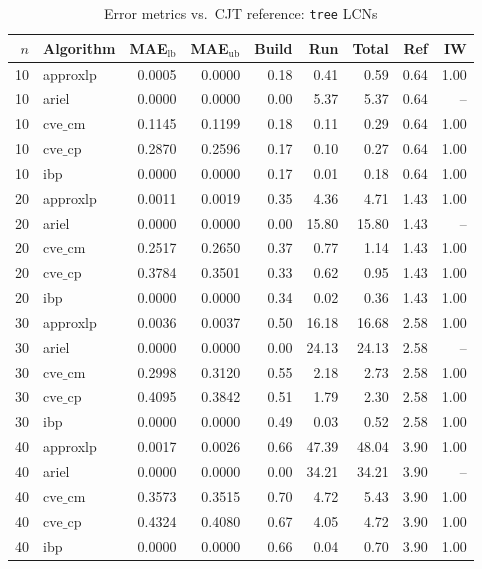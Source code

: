 \documentclass{article}
\begin{document}
\begin{table}[ht]
\centering
\caption{Error metrics vs.\ CJT reference: \texttt{tree} LCNs}
\begin{tabular}{rlrrrrrrr}
\toprule
 $n$ & Algorithm & MAE$_{\text{lb}}$ & MAE$_{\text{ub}}$ & Build & Run & Total & Ref & IW \\
\midrule
 10 & approxlp & 0.0005 & 0.0000 & 0.18 & 0.41 & 0.59 & 0.64 & 1.00 \\
 10 & ariel & 0.0000 & 0.0000 & 0.00 & 5.37 & 5.37 & 0.64 & -- \\
 10 & $\text{cve\_cm}$ & 0.1145 & 0.1199 & 0.18 & 0.11 & 0.29 & 0.64 & 1.00 \\
 10 & $\text{cve\_cp}$ & 0.2870 & 0.2596 & 0.17 & 0.10 & 0.27 & 0.64 & 1.00 \\
 10 & ibp & 0.0000 & 0.0000 & 0.17 & 0.01 & 0.18 & 0.64 & 1.00 \\
\hline
 20 & approxlp & 0.0011 & 0.0019 & 0.35 & 4.36 & 4.71 & 1.43 & 1.00 \\
 20 & ariel & 0.0000 & 0.0000 & 0.00 & 15.80 & 15.80 & 1.43 & -- \\
 20 & $\text{cve\_cm}$ & 0.2517 & 0.2650 & 0.37 & 0.77 & 1.14 & 1.43 & 1.00 \\
 20 & $\text{cve\_cp}$ & 0.3784 & 0.3501 & 0.33 & 0.62 & 0.95 & 1.43 & 1.00 \\
 20 & ibp & 0.0000 & 0.0000 & 0.34 & 0.02 & 0.36 & 1.43 & 1.00 \\
\hline
 30 & approxlp & 0.0036 & 0.0037 & 0.50 & 16.18 & 16.68 & 2.58 & 1.00 \\
 30 & ariel & 0.0000 & 0.0000 & 0.00 & 24.13 & 24.13 & 2.58 & -- \\
 30 & $\text{cve\_cm}$ & 0.2998 & 0.3120 & 0.55 & 2.18 & 2.73 & 2.58 & 1.00 \\
 30 & $\text{cve\_cp}$ & 0.4095 & 0.3842 & 0.51 & 1.79 & 2.30 & 2.58 & 1.00 \\
 30 & ibp & 0.0000 & 0.0000 & 0.49 & 0.03 & 0.52 & 2.58 & 1.00 \\
\hline
 40 & approxlp & 0.0017 & 0.0026 & 0.66 & 47.39 & 48.04 & 3.90 & 1.00 \\
 40 & ariel & 0.0000 & 0.0000 & 0.00 & 34.21 & 34.21 & 3.90 & -- \\
 40 & $\text{cve\_cm}$ & 0.3573 & 0.3515 & 0.70 & 4.72 & 5.43 & 3.90 & 1.00 \\
 40 & $\text{cve\_cp}$ & 0.4324 & 0.4080 & 0.67 & 4.05 & 4.72 & 3.90 & 1.00 \\
 40 & ibp & 0.0000 & 0.0000 & 0.66 & 0.04 & 0.70 & 3.90 & 1.00 \\

\end{tabular}
\end{table}
\end{document}
